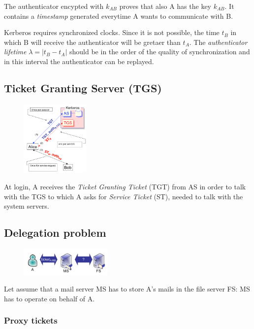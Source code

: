 \documentclass[a4paper,12pt]{article}
\begin{document}
The authenticator encypted with $k_{AB}$ proves that also A has the key $k_{AB}$. It contains a \textit{timestamp} generated everytime A wants to communicate with B.

Kerberos requires synchronized clocks. Since it is not possible, the time $t_B$ in which B will receive the authenticator will be gretaer than $t_A$.
The \textit{authenticator lifetime} $\lambda = |t_B - t_A|$ should be in the order of the quality of synchronization and in this interval the authenticator can be replayed.

\subsection{Ticket Granting Server (TGS)}
\begin{figure}[H]
  \centering
  \includegraphics[width=0.3\textwidth]{img/tgs}
\end{figure}

At login, A receives the \textit{Ticket Granting Ticket} (TGT) from AS in order to talk with the TGS to which A asks for \textit{Service Ticket} (ST), needed to talk with the system servers.

\subsection{Delegation problem}
\begin{figure}[H]
  \centering
  \includegraphics[width=0.4\textwidth]{img/delegation}
\end{figure}

Let assume that a mail server MS has to store A's mails in the file server FS: MS has to operate on behalf of A.

\subsubsection{Proxy tickets}
\end{document}
